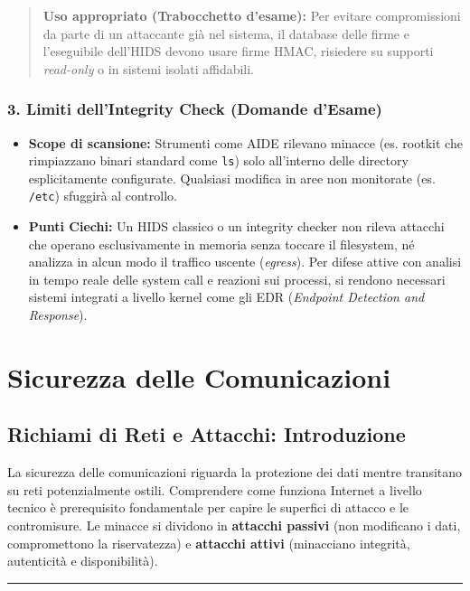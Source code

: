 \documentclass[12pt, a4paper]{report}
\begin{document}
\begin{quote}
	\textbf{Uso appropriato (Trabocchetto d'esame):} Per evitare compromissioni da parte di un attaccante già nel sistema, il database delle firme e l'eseguibile dell'HIDS devono usare firme HMAC, risiedere su supporti \textit{read-only} o in sistemi isolati affidabili.
\end{quote}

\subsection{3. Limiti dell'Integrity Check (Domande d'Esame)}
\begin{itemize}
	\item \textbf{Scope di scansione:} Strumenti come AIDE rilevano minacce (es. rootkit che rimpiazzano binari standard come \texttt{ls}) solo all'interno delle directory esplicitamente configurate. Qualsiasi modifica in aree non monitorate (es. \texttt{/etc}) sfuggirà al controllo.
	\item \textbf{Punti Ciechi:} Un HIDS classico o un integrity checker non rileva attacchi che operano esclusivamente in memoria senza toccare il filesystem, né analizza in alcun modo il traffico uscente (\textit{egress}). Per difese attive con analisi in tempo reale delle system call e reazioni sui processi, si rendono necessari sistemi integrati a livello kernel come gli EDR (\textit{Endpoint Detection and Response}).
\end{itemize}

\chapter{Sicurezza delle Comunicazioni}

\section{Richiami di Reti e Attacchi: Introduzione}

La sicurezza delle comunicazioni riguarda la protezione dei dati mentre transitano su reti potenzialmente ostili. Comprendere come funziona Internet a livello tecnico è prerequisito fondamentale per capire le superfici di attacco e le contromisure. Le minacce si dividono in \textbf{attacchi passivi} (non modificano i dati, compromettono la riservatezza) e \textbf{attacchi attivi} (minacciano integrità, autenticità e disponibilità).

\noindent\rule{\textwidth}{0.4pt}
\end{document}
